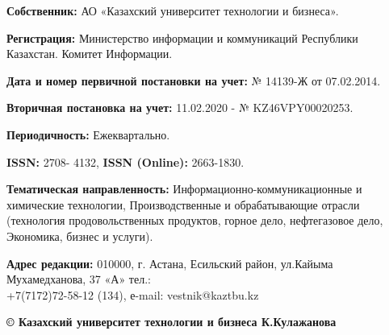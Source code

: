 {\textbf{Собственник:} АО «Казахский университет технологии и бизнеса».

\textbf{Регистрация:} Министерство информации и коммуникаций Республики
Казахстан. Комитет Информации.

\textbf{Дата и номер первичной постановки на учет:} № 14139-Ж от 07.02.2014.

\textbf{Вторичная постановка на учет:} 11.02.2020 - № KZ46VPY00020253.

\textbf{Периодичность:} Ежеквартально.

\textbf{ISSN:} 2708- 4132, \textbf{ISSN (Online):} 2663-1830.

\textbf{Тематическая направленность:} Информационно-коммуникационные и
химические технологии, Производственные и обрабатывающие отрасли (технология
продовольственных продуктов, горное дело, нефтегазовое дело, Экономика, бизнес и
услуги).

\textbf{Адрес редакции:} 010000, г. Астана, Есильский район, ул.Кайыма
Мухамедханова, 37 «А» тел.: \\+7(7172)72-58-12 (134), е-mail: vestnik@kaztbu.kz
\vfill
\begin{center}
\textbf{\normalsize © Казахский университет технологии и бизнеса К.Кулажанова}
\end{center}
}
\pagebreak
